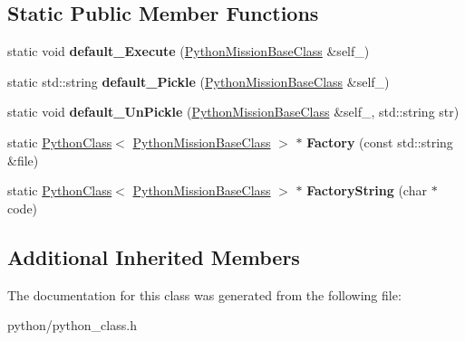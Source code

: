 \subsection*{Static Public Member Functions}
\begin{DoxyCompactItemize}
\item 
static void {\bfseries default\+\_\+\+Execute} (\hyperlink{classPythonMissionBaseClass}{Python\+Mission\+Base\+Class} \&self\+\_\+)\hypertarget{classpythonMission_ad927980069945e36c4b8061bf85d270a}{}\label{classpythonMission_ad927980069945e36c4b8061bf85d270a}

\item 
static std\+::string {\bfseries default\+\_\+\+Pickle} (\hyperlink{classPythonMissionBaseClass}{Python\+Mission\+Base\+Class} \&self\+\_\+)\hypertarget{classpythonMission_a01759b4a200f0377ae94f625d25982df}{}\label{classpythonMission_a01759b4a200f0377ae94f625d25982df}

\item 
static void {\bfseries default\+\_\+\+Un\+Pickle} (\hyperlink{classPythonMissionBaseClass}{Python\+Mission\+Base\+Class} \&self\+\_\+, std\+::string str)\hypertarget{classpythonMission_a039a8cc4f9d290424a60be4c449c4696}{}\label{classpythonMission_a039a8cc4f9d290424a60be4c449c4696}

\item 
static \hyperlink{classPythonClass}{Python\+Class}$<$ \hyperlink{classPythonMissionBaseClass}{Python\+Mission\+Base\+Class} $>$ $\ast$ {\bfseries Factory} (const std\+::string \&file)\hypertarget{classpythonMission_ac7f3369d3cda16816d18687d7b0fbf35}{}\label{classpythonMission_ac7f3369d3cda16816d18687d7b0fbf35}

\item 
static \hyperlink{classPythonClass}{Python\+Class}$<$ \hyperlink{classPythonMissionBaseClass}{Python\+Mission\+Base\+Class} $>$ $\ast$ {\bfseries Factory\+String} (char $\ast$code)\hypertarget{classpythonMission_a4b7e3e0196af2c0a3af061230027ee60}{}\label{classpythonMission_a4b7e3e0196af2c0a3af061230027ee60}

\end{DoxyCompactItemize}
\subsection*{Additional Inherited Members}


The documentation for this class was generated from the following file\+:\begin{DoxyCompactItemize}
\item 
python/python\+\_\+class.\+h\end{DoxyCompactItemize}

